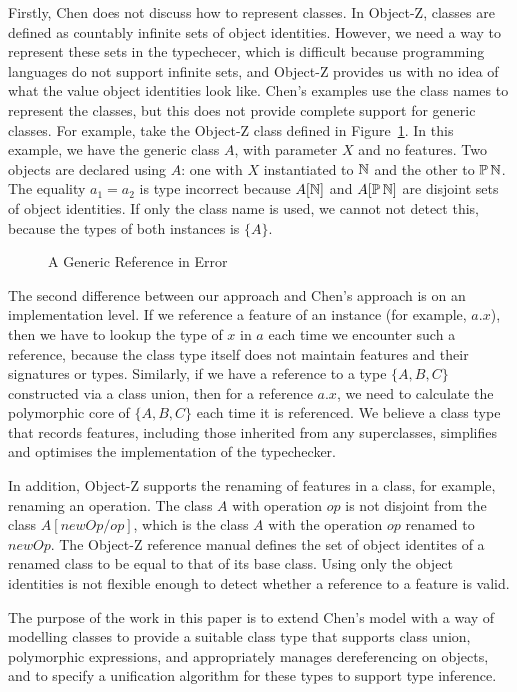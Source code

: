 Firstly, Chen does not discuss how to represent classes. In Object-Z,
classes are defined as countably infinite sets of object
identities. However, we need a way to represent these sets in the
typechecer, which is difficult because programming languages do not
support infinite sets, and Object-Z provides us with no idea of what
the value object identities look like. Chen's examples use the class
names to represent the classes, but this does not provide complete
support for generic classes. For example, take the Object-Z class
defined in Figure~\ref{generic-class-A}.  In this example, we have the
generic class $A$, with parameter $X$ and no features.  Two objects
are declared using $A$: one with $X$ instantiated to ${\mathbb N}$ and the
other to $\power \nat$. The equality $a_{1} = a_{2}$ is type incorrect
because $A[{\mathbb N}]$ and $A[\power \nat]$ are disjoint sets of object
identities. If only the class name is used, we cannot not detect this,
because the types of both instances is $\{A\}$. 

\begin{figure}[t]

\caption{A Generic Reference in Error}
\label{generic-class-A}
\end{figure}


The second difference between our approach and Chen's approach is on
an implementation level. If we reference a feature of an instance (for
example, $a.x$), then we have to lookup the type of $x$ in $a$ each
time we encounter such a reference, because the class type itself does
not maintain features and their signatures or types.  Similarly, if we
have a reference to a type $\{ A, B, C\}$ constructed via a class
union, then for a reference $a.x$, we need to calculate the
polymorphic core of $\{A,B,C\}$ each time it is referenced. We believe
a class type that records features, including those inherited from any
superclasses, simplifies and optimises the implementation of the
typechecker.

In addition, Object-Z supports the renaming of features in a class,
for example, renaming an operation. The class $A$ with operation $op$
is not disjoint from the class $A[newOp/op]$, which is the class $A$ with
the operation $op$ renamed to $newOp$. The Object-Z reference manual
\cite{smith00} defines the set of object identites of a renamed class
to be equal to that of its base class. Using only the object
identities is not flexible enough to detect whether a reference to a
feature is valid.

The purpose of the work in this paper is to extend Chen's model with a
way of modelling classes to provide a suitable class type that
supports class union, polymorphic expressions, and appropriately
manages dereferencing on objects, and to specify a unification
algorithm for these types to support type inference.
